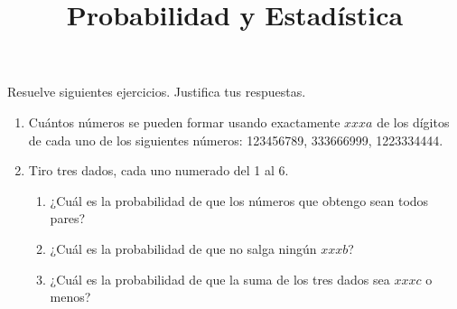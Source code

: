 \documentclass[oneside]{article}
\title{Probabilidad y Estadística}
\newcommand{\numa}{xxxa} %
\newcommand{\numb}{xxxb} %
\newcommand{\numc}{xxxc} %
\begin{document}
\maketitle
Resuelve siguientes ejercicios. Justifica tus respuestas.
\begin{enumerate}
	\item Cuántos números se pueden formar usando exactamente $\numa$ de los dígitos de cada uno de los siguientes números: 123456789, 333666999, 1223334444.
	\item Tiro tres dados, cada uno numerado del 1 al 6.
	\begin{enumerate}
		\item ¿Cuál es la probabilidad de que los números que obtengo sean todos pares?
		\item ¿Cuál es la probabilidad de que no salga ningún $\numb$?
		\item ¿Cuál es la probabilidad de que la suma de los tres dados sea $\numc$ o menos?
	\end{enumerate}
\end{enumerate}
\end{document}
